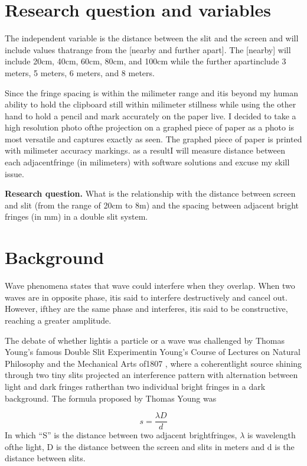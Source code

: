 
\section{Research question and variables}
The independent variable is the distance between the slit and the screen and will include values thatrange from the [nearby and further apart]. The [nearby] will include 20cm, 40cm, 60cm, 80cm, and 100cm while the further apartinclude 3 meters, 5 meters, 6 meters, and 8 meters.

Since the fringe spacing is within the milimeter range and itis beyond my human ability to hold the clipboard still within milimeter stillness while using the other hand to hold a pencil and mark accurately on the paper live. I decided to take a high resolution photo ofthe projection on a graphed piece of paper as a photo is most versatile and captures exactly as seen. The graphed piece of paper is printed with milimeter accuracy markings. as a resultI will measure distance between each adjacentfringe (in milimeters) with software solutions and excuse my skill issue.

\textbf{Research question.} What is the relationship with the distance between screen and slit (from the range of 20cm to 8m) and the spacing between adjacent bright fringes (in mm) in a double slit system.

\section{Background}
Wave phenomena states that wave could interfere when they overlap. When two waves are in opposite phase, itis said to interfere destructively and cancel out. However, ifthey are the same phase and interferes, itis said to be constructive, reaching a greater amplitude.

The debate of whether lightis a particle or a wave was challenged by Thomas Young's famous Double Slit Experimentin Young's Course of Lectures on Natural Philosophy and the Mechanical Arts of1807 , where a coherentlight source shining through two tiny slits projected an interference pattern with alternation between light and dark fringes ratherthan two individual bright fringes in a dark background. The formula proposed by Thomas Young was

\begin{equation} s = \frac{\lambda D}{d} \end{equation}
In which ``S'' is the distance between two adjacent brightfringes, \ensuremath{\lambda} is wavelength ofthe light, D is the distance between the screen and slits in meters and d is the distance between slits.

